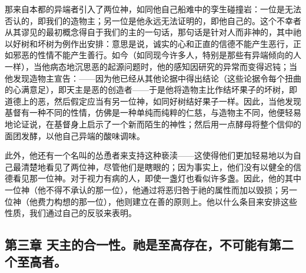 那来自本都的异端者引入了两位神，如同他自己船难中的孪生碰撞岩：一位是无法否认的，即我们的造物主；另一位是他永远无法证明的，即他自己的。这个不幸者从其谬见的最初概念得自于我们的主的一句话，那句话是针对人而非神的，其中祂以好树和坏树为例作出安排：意思是说，诚实的心和正直的信德不能产生恶行，正如邪恶的性情不能产生善行。如今（如同现今许多人，特别是那些有异端倾向的人一样），当他病态地沉思恶的起源问题时，他的感知因研究的异常而变得迟钝；当他发现造物主宣告：——因为他已经从其他论据中得出结论（这些论据令每个扭曲的心满意足），即天主是恶的创造者——于是他将造物主比作结坏果子的坏树，即道德上的恶，然后假定应当有另一位神，如同好树结好果子一样。因此，当他发现基督有一种不同的性情，仿佛是一种单纯而纯粹的仁慈，与造物主不同，他便轻易地论证说，在基督身上启示了一个新而陌生的神性；然后用一点酵母将整个信仰的面团发酵，以他自己异端的酸味调味。\par

此外，他还有一个名叫的怂恿者来支持这种亵渎——这使得他们更加轻易地以为自己最清楚地看见了两位神，尽管他们是瞎眼的；因为事实上，他们没有以健全的信德看见那一位神。对于视力有病的人，即使一盏灯也看似许多盏。因此，他的其中一位神（他不得不承认的那一位），他通过将恶归咎于祂的属性而加以毁损；另一位神（他费力构想的那一位），他则建立在善的原则上。他以什么条目来安排这些性质，我们通过自己的反驳来表明。\par


\subsection{第三章 天主的合一性。祂是至高存在，不可能有第二个至高者。}

